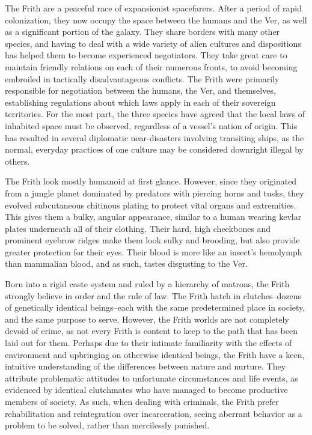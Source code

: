 \documentclass[blue]{guildcamp4}
\begin{document}
\name{\bFrith{}}

The Frith are a peaceful race of expansionist spacefarers. After a period of rapid colonization, they now occupy the space between the humans and the Ver, as well as a significant portion of the galaxy. They share borders with many other species, and having to deal with a wide variety of alien cultures and dispositions has helped them to become experienced negotiators. They take great care to maintain friendly relations on each of their numerous fronts, to avoid becoming embroiled in tactically disadvantageous conflicts. The Frith were primarily responsible for negotiation between the humans, the Ver, and themselves, establishing regulations about which laws apply in each of their sovereign territories. For the most part, the three species have agreed that the local laws of inhabited space must be observed, regardless of a vessel's nation of origin. This has resulted in several diplomatic near-disasters involving transiting ships, as the normal, everyday practices of one culture may be considered downright illegal by others.
	
The Frith look mostly humanoid at first glance. However, since they originated from a jungle planet dominated by predators with piercing horns and tusks, they evolved subcutaneous chitinous plating to protect vital organs and extremities. This gives them a bulky, angular appearance, similar to a human wearing kevlar plates underneath all of their clothing. Their hard, high cheekbones and prominent eyebrow ridges make them look sulky and brooding, but also provide greater protection for their eyes. Their blood is more like an insect's hemolymph than mammalian blood, and as such, tastes disgusting to the Ver.

Born into a rigid caste system and ruled by a hierarchy of matrons, the Frith strongly believe in order and the rule of law. The Frith hatch in clutches--dozens of genetically identical beings--each with the same predetermined place in society, and the same purpose to serve. However, the Frith worlds are not completely devoid of crime, as not every Frith is content to keep to the path that has been laid out for them. Perhaps due to their intimate familiarity with the effects of environment and upbringing on otherwise identical beings, the Frith have a keen, intuitive understanding of the differences between nature and nurture. They attribute problematic attitudes to unfortunate circumstances and life events, as evidenced by identical clutchmates who have managed to become productive members of society. As such, when dealing with criminals, the Frith prefer rehabilitation and reintegration over incarceration, seeing aberrant behavior as a problem to be solved, rather than mercilessly punished. 
\end{document}
